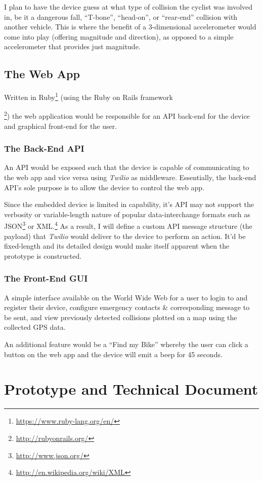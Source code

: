 \documentclass[titlepage]{article}
\begin{document}
I plan to have the device guess at what type of collision the cyclist was involved in, be it a dangerous fall, ``T-bone'', ``head-on'', or ``rear-end'' collision with another vehicle. This is where the benefit of a 3-dimensional accelerometer would come into play (offering magnitude and direction), as opposed to a simple accelerometer that provides just magnitude.

\subsection{The Web App}
Written in Ruby\footnote{\url{https://www.ruby-lang.org/en/}} (using the Ruby on Rails framework{\footnote{\url{http://rubyonrails.org/}}) the web application would be responsible for an API back-end for the device and graphical front-end for the user.

\subsubsection{The Back-End API}
An API would be exposed such that the device is capable of communicating to the web app and vice versa using {\em Twilio} as middleware. Essentially, the back-end API's sole purpose is to allow the device to control the web app.

Since the embedded device is limited in capability, it's API may not support the verbosity or variable-length nature of popular data-interchange formats such as JSON\footnote{\url{http://www.json.org/}} or XML.\footnote{\url{http://en.wikipedia.org/wiki/XML}} As a result, I will define a custom API message structure (the payload) that {\em Twilio} would deliver to the device to perform an action. It'd be fixed-length and its detailed design would make itself apparent when the prototype is constructed.

\subsubsection{The Front-End GUI}
A simple interface available on the World Wide Web for a user to login to and register their device, configure emergency contacts \& corresponding message to be sent, and view previously detected collisions plotted on a map using the collected GPS data.

An additional feature would be a ``Find my Bike'' whereby the user can click a button on the web app and the device will emit a beep for 45 seconds.

\section{Prototype and Technical Document}
}
\end{document}
